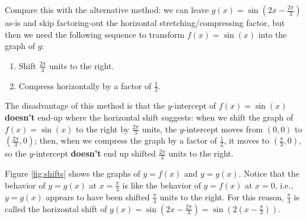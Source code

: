       Compare this with the alternative method: we can leave $g(x)=\sin  \left( 2x-\frac{2\pi}{3} \right)$ as-is and skip factoring-out the horizontal stretching/compressing factor, but then we need the following sequence to transform $f(x)=\sin(x)$ into the graph of $g$:
      
      \begin{enumerate}
        \item Shift $\frac{2\pi}{3}$ units to the right.
        \item Compress horizontally by a factor of $\frac{1}{2}$.
      \end{enumerate}
    
      The disadvantage of this method is that the $y$-intercept of $f(x)=\sin(x)$ \textbf{doesn't} end-up where the horizontal shift suggests: when we shift the graph of $f(x)=\sin(x)$ to the right by $\frac{2\pi}{3}$ units, the $y$-intercept moves from $ \left( 0,0 \right)$ to $\left( \frac{2\pi}{3},0\right)$; then, when we compress the graph by a factor of $\frac{1}{2}$, it moves to $\left( \frac{\pi}{3},0\right)$, so the $y$-intercept \textbf{doesn't} end up shifted $\frac{2\pi}{3}$ units to the right.
    
      Figure \ref{fig:shifts} shows the graphs of $y=f(x)$ and $y=g(x)$. Notice that the behavior of $y=g(x)$ at $x=\frac{\pi}{3}$ is like the behavior of $y=f(x)$ at $x=0$, i.e., $y=g(x)$ appears to have been shifted $\frac{\pi}{3}$ units to the right. For this reason, $\frac{\pi}{3}$ is called the horizontal shift of $g(x)=\sin  \left( 2x-\frac{2\pi}{3}\right)=\sin \left( 2\left( x-\frac{\pi}{3}\right)\right)$.
      
      \begin{center}
        \captionsetup{type=figure} 
            \label{fig:shifts}
      \end{center}
    
